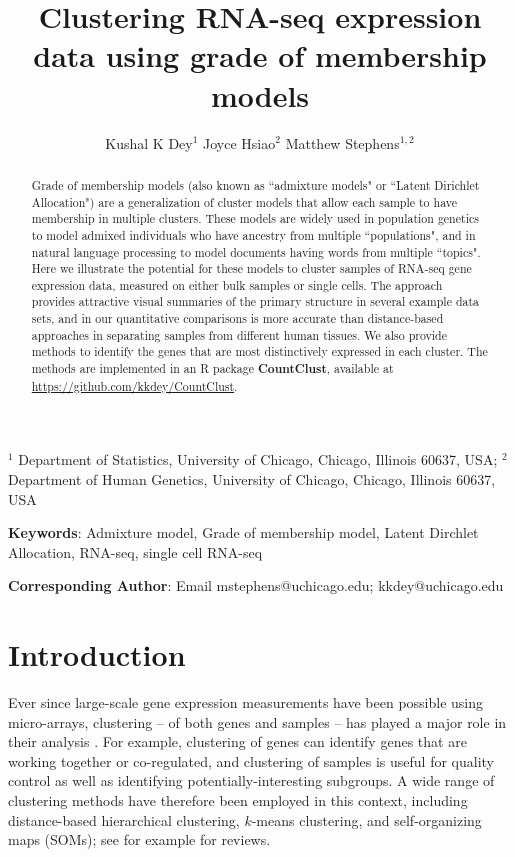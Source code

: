 \title{\Large{\textbf{Clustering RNA-seq expression data using grade of membership models}}}
\author{ Kushal K Dey$^{1}$  \qquad Joyce Hsiao$^{2}$ \qquad Matthew Stephens$^{1,2}$}

\maketitle

$^{1}$ Department of Statistics, University of Chicago, Chicago, Illinois 60637, USA;  $^{2}$ Department of Human Genetics, University of Chicago, Chicago, Illinois 60637, USA

\textbf{Keywords}: Admixture model, Grade of membership model, Latent Dirchlet Allocation, RNA-seq, single cell RNA-seq

\textbf{Corresponding Author}: Email mstephens@uchicago.edu; kkdey@uchicago.edu 
					      


\newpage

\begin{abstract}
Grade of membership models (also known as ``admixture models" or ``Latent Dirichlet Allocation") 
are a generalization of cluster models that allow each sample to have membership in multiple clusters.
These models are widely used in population genetics to model admixed individuals who have ancestry from multiple ``populations", 
and in natural language processing to model documents having words from multiple ``topics". Here we illustrate the potential for these models
to cluster samples of RNA-seq gene expression data, measured on either bulk samples or single cells. The approach provides 
attractive visual summaries of the primary structure in several example data sets, and in our quantitative comparisons is more accurate
than distance-based approaches in separating samples from different human tissues. We also provide methods to identify the genes that are most distinctively expressed in each cluster. The methods are implemented in an R package \textbf{CountClust}, available at \url{https://github.com/kkdey/CountClust}.
\end{abstract}

\section{Introduction}

Ever since large-scale gene expression measurements have been possible using micro-arrays, clustering -- of both genes and samples -- 
has played a major role in their analysis \cite{Eisen1998}\cite{Golub1999} \cite{Alizadeh2000}.
For example, clustering of genes can identify genes that are working together or co-regulated, and clustering of samples is useful for quality control 
as well as identifying potentially-interesting subgroups. A wide range of clustering methods have therefore
been employed in this context, including distance-based hierarchical clustering, $k$-means clustering, and self-organizing maps (SOMs); see for example \cite{D'haeseleer2005} \cite{Jiang2004} for reviews. 

